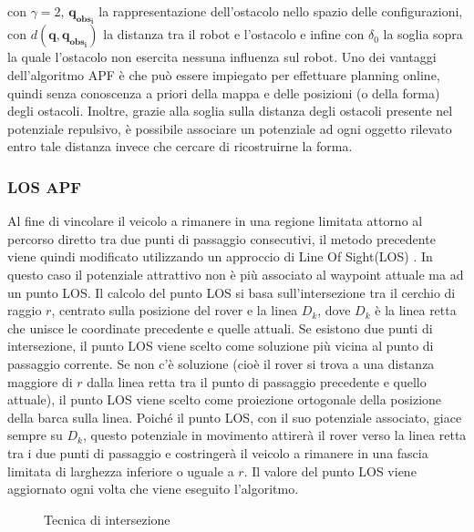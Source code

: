 con $ \gamma = 2$, $ \boldsymbol{q_{obs_i}} $ la rappresentazione dell'ostacolo nello spazio delle configurazioni, con $ d( \boldsymbol{q},  \boldsymbol{q_{obs_i}}) $ la
distanza tra il robot e l'ostacolo e infine con $ \delta_0 $ la soglia sopra la quale l'ostacolo non esercita nessuna influenza sul robot.
Uno dei vantaggi dell'algoritmo APF è che può essere impiegato per effettuare planning online, quindi senza conoscenza a priori della mappa e delle posizioni (o della 
forma) degli ostacoli. Inoltre, grazie alla soglia sulla distanza degli ostacoli presente nel potenziale repulsivo, è possibile associare un potenziale ad ogni oggetto rilevato entro tale distanza invece che cercare di ricostruirne la forma.

\subsubsection{LOS APF}
 Al fine di vincolare il veicolo a rimanere in una regione limitata attorno al percorso diretto tra due punti di passaggio consecutivi, il metodo precedente viene quindi modificato utilizzando un approccio di Line Of Sight(LOS) \cite{LOSAPF}. In questo caso il potenziale attrattivo non è più associato al waypoint attuale ma ad un punto LOS.
Il calcolo del punto LOS si basa sull'intersezione tra il cerchio di raggio $r$, centrato sulla posizione del rover e la linea $D_k$, dove $D_k$ è la linea retta che unisce le coordinate precedente e quelle attuali. Se esistono due punti di intersezione, il punto LOS viene scelto come soluzione più vicina al punto di passaggio corrente. Se non c'è soluzione (cioè il rover si trova a una distanza maggiore di $r$ dalla linea retta tra il punto di passaggio precedente e quello attuale), il punto LOS viene scelto come proiezione ortogonale della posizione della barca sulla linea.
Poiché il punto LOS, con il suo potenziale associato, giace sempre su $D_k$, questo potenziale in movimento attirerà il rover verso la linea retta tra i due punti di passaggio e costringerà il veicolo a rimanere in una fascia limitata di larghezza inferiore o uguale a $r$. 
Il valore del punto LOS viene aggiornato ogni volta che viene eseguito l'algoritmo.
\begin{figure} [H]
    \centering
    
    \caption{Tecnica di intersezione}
    \label{fig:LOS}
\end{figure}

